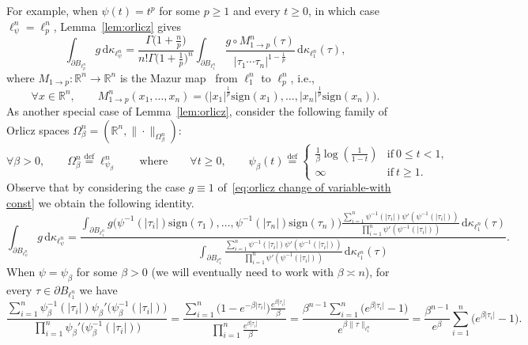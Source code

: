 \documentclass[11pt,reqno]{amsart}
\renewcommand{\le}{\leqslant}
\renewcommand{\ge}{\geqslant}
\newcommand{\ud}[0]{\,\mathrm{d}}
\newcommand{\sign}{\mathrm{sign}}
\newcommand{\R}{\mathbb R}
\theoremstyle{remark}
\newcommand{\eqdef}{\stackrel{\mathrm{def}}{=}}
\renewcommand{\1}{\mathbf 1}
\begin{document}
For example, when $\psi(t)=t^p$ for some $p\ge 1$ and every $t\ge 0$, in which case $\ell_\psi^n=\ell_p^n$, Lemma~\ref{lem:orlicz} gives
$$
\int_{\partial B_{\ell_{p}^n}} g\ud \kappa_{\ell_{\psi}^n}=\frac{\Gamma\big(1+\frac{n}{p}\big)}{n!\Gamma\big(1+\frac{1}{p}\big)^n}\int_{\partial B_{\ell_1^n}} \frac{g\circ M_{ 1\to p}^n (\tau)}{|\tau_1\cdots \tau_n|^{1-\frac{1}{p}}}\ud \kappa_{\ell_1^n}(\tau),
$$
where $M_{1\to p}:\R^n\to \R^n$ is the Mazur map~\cite{Maz29} from $\ell_1^n$ to $\ell_p^n$, i.e.,
$$
\forall x\in \R^n,\qquad M_{1\to p}^n(x_1,\ldots ,x_n)=\big(|x_1|^{\frac{1}{p}}\sign(x_1),\ldots,|x_n|^{\frac{1}{p}}\sign(x_n)\big).
$$
As another special case of Lemma~\ref{lem:orlicz}, consider the following family of Orlicz spaces $\Omega_\beta^n=(\R^n,\|\cdot\|_{\Omega_\beta^n})$:
\begin{equation}\label{eq:our orlicz notation}
\forall \beta>0,\qquad \Omega_\beta^n\eqdef \ell_{\psi_{\!\!\beta}}^n\qquad\mathrm{where}\qquad \forall t\ge 0,\qquad \psi_{\!\!\beta}(t)\eqdef \left\{\begin{array}{ll}\frac{1}{\beta}\log\left(\frac{1}{1-t}\right)&\mathrm{if}\ 0\le t<1,\\
\infty&\mathrm{if}\ t\ge 1.\end{array}\right.
\end{equation}
Observe that by considering the case $g\equiv 1$ of~\eqref{eq:orlicz change of variable-with const} we obtain the following identity.
\begin{equation}\label{eq:orlicz change of variable}
\int_{\partial B_{\ell_{\psi}^n}}  g\ud \kappa_{\ell_{\psi}^n}=\frac{\int_{\partial B_{\ell_1^n}} g\big(\psi^{-1}(|\tau_i|)\sign(\tau_1),\ldots,\psi^{-1}(|\tau_n|)\sign(\tau_n)\big) \frac{\sum_{i=1}^n \psi^{-1}(|\tau_i|)\psi'(\psi^{-1}(|\tau_i|))}{\prod_{i=1}^n\psi'(\psi^{-1}(|\tau_i|))}\ud \kappa_{\ell_1^n}(\tau)}{\int_{\partial B_{\ell_1^n}} \frac{\sum_{i=1}^n \psi^{-1}(|\tau_i|)\psi'(\psi^{-1}(|\tau_i|))}{\prod_{i=1}^n\psi'(\psi^{-1}(|\tau_i|))}\ud \kappa_{\ell_1^n}(\tau)}.
\end{equation}
When $\psi=\psi_{\!\!\beta}$ for some $\beta>0$ (we will eventually need to work with $\beta\asymp n$), for every $\tau\in \partial B_{\ell_1^n}$ we have
\begin{equation}\label{eq:orlicz density beta}
\frac{\sum_{i=1}^n \psi_{\!\!\beta}^{-1}(|\tau_i|)\psi_{\!\!\beta}'\big(\psi_{\!\!\beta}^{-1}(|\tau_i|)\big)}{\prod_{i=1}^n\psi_{\!\!\beta}'\big(\psi_{\!\!\beta}^{-1}(|\tau_i|)\big)}=\frac{\sum_{i=1}^n \big(1-e^{-\beta|\tau_i|}\big)\frac{e^{\beta|\tau_i|}}{\beta}}{\prod_{i=1}^n \frac{e^{\beta|\tau_i|}}{\beta}}=\frac{\beta^{n-1}\sum_{i=1}^n \big(e^{\beta|\tau_i|}-1\big)}{e^{\beta\|\tau\|_{\ell_1^n}}}= \frac{\beta^{n-1}}{e^\beta}\sum_{i=1}^n \big(e^{\beta|\tau_i|}-1\big).
\end{equation}
\end{document}
